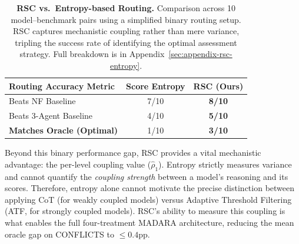 \documentclass[11pt]{article}
\theoremstyle{definition}
\begin{document}
\begin{table}[h]
\centering
\small
\begin{tabular}{@{}lcc@{}}
\toprule
\textbf{Routing Accuracy Metric} & \textbf{Score Entropy} & \textbf{RSC (Ours)} \\
\midrule
Beats NF Baseline & 7/10 & \textbf{8/10} \\
Beats 3-Agent Baseline & 4/10 & \textbf{5/10} \\
\midrule
\textbf{Matches Oracle (Optimal)} & 1/10 & \textbf{3/10} \\
\bottomrule
\end{tabular}
\caption{\textbf{RSC vs.\ Entropy-based Routing.} Comparison across 10 model--benchmark pairs using a simplified binary routing setup. RSC captures mechanistic coupling rather than mere variance, tripling the success rate of identifying the optimal assessment strategy. Full breakdown is in Appendix~\ref{sec:appendix-rsc-entropy}.}
\label{tab:rsc_vs_entropy_main}
\end{table}

Beyond this binary performance gap, RSC provides a vital mechanistic advantage: the per-level coupling value (\(\hat{\rho}_1\)). Entropy strictly measures variance and cannot quantify the \emph{coupling strength} between a model's reasoning and its scores. Therefore, entropy alone cannot motivate the precise distinction between applying CoT (for weakly coupled models) versus Adaptive Threshold Filtering (ATF, for strongly coupled models). RSC's ability to measure this coupling is what enables the full four-treatment MADARA architecture, reducing the mean oracle gap on CONFLICTS to \(\le 0.4\)pp.
\end{document}
